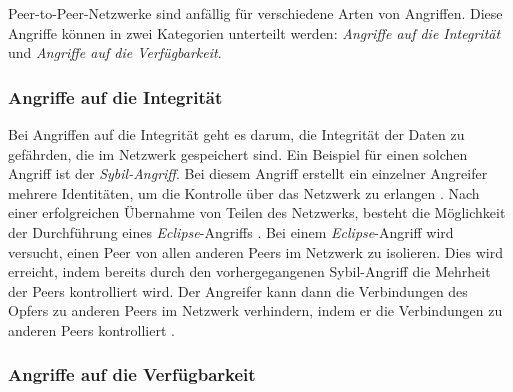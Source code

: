 Peer-to-Peer-Netzwerke sind anfällig für verschiedene Arten von Angriffen. Diese Angriffe können in zwei Kategorien unterteilt werden: \textit{Angriffe auf die Integrität} und \textit{Angriffe auf die Verfügbarkeit}.

\subsubsection{Angriffe auf die Integrität}
\label{subsubsec:eclipse_attack_p2p}

Bei Angriffen auf die Integrität geht es darum, die Integrität der Daten zu gefährden, die im Netzwerk gespeichert sind. Ein Beispiel für einen solchen Angriff ist der \textit{Sybil-Angriff}. Bei diesem Angriff erstellt ein einzelner Angreifer mehrere Identitäten, um die Kontrolle über das Netzwerk zu erlangen \parencite[S. 251]{Douceur_SybilAttack}. Nach einer erfolgreichen Übernahme von Teilen des Netzwerks, besteht die Möglichkeit der Durchführung eines \textit{Eclipse}-Angriffs \parencite[S. 13-15]{Baptiste_AttacksOnP2PNetworks}. Bei einem \textit{Eclipse}-Angriff wird versucht, einen Peer von allen anderen Peers im Netzwerk zu isolieren. Dies wird erreicht, indem bereits durch den vorhergegangenen Sybil-Angriff die Mehrheit der Peers kontrolliert wird. Der Angreifer kann dann die Verbindungen des Opfers zu anderen Peers im Netzwerk verhindern, indem er die Verbindungen zu anderen Peers kontrolliert \Parencite[S. 14]{Baptiste_AttacksOnP2PNetworks}. 


\subsubsection{Angriffe auf die Verfügbarkeit}

